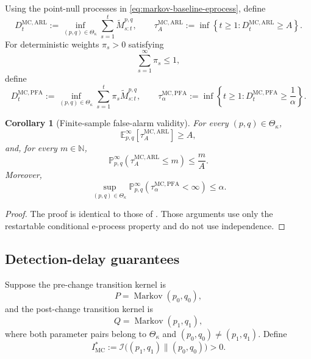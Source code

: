 \documentclass[12pt]{article}
\DeclareMathOperator{\Markov}{Markov}
\theoremstyle{spaced}
\newtheorem{corollary}[corollary]{Corollary}
\theoremstyle{remark}
\begin{document}
Using the point-null processes in
\eqref{eq:markov-baseline-eprocess}, define
\begin{equation}
\label{eq:markov-arl-detector}
    D_t^{\mathrm{MC},\mathrm{ARL}}
    :=
    \inf_{(p,q)\in\Theta_\kappa}
    \sum_{s=1}^t
    \widetilde M_{s:t}^{p,q},
    \qquad
    \tau_A^{\mathrm{MC},\mathrm{ARL}}
    :=
    \inf\left\{
        t\ge1:
        D_t^{\mathrm{MC},\mathrm{ARL}}\ge A
    \right\}.
\end{equation}
For deterministic weights \(\pi_s>0\) satisfying
\[
    \sum_{s=1}^\infty\pi_s\le1,
\]
define
\begin{equation}
\label{eq:markov-pfa-detector}
    D_t^{\mathrm{MC},\mathrm{PFA}}
    :=
    \inf_{(p,q)\in\Theta_\kappa}
    \sum_{s=1}^t
    \pi_s\widetilde M_{s:t}^{p,q},
    \qquad
    \tau_\alpha^{\mathrm{MC},\mathrm{PFA}}
    :=
    \inf\left\{
        t\ge1:
        D_t^{\mathrm{MC},\mathrm{PFA}}
        \ge\frac1\alpha
    \right\}.
\end{equation}

\begin{corollary}[Finite-sample false-alarm validity]
\label{cor:markov-false-alarm}
For every \((p,q)\in\Theta_\kappa\),
\[
    \mathbb E_{p,q}^\infty
    \left[
        \tau_A^{\mathrm{MC},\mathrm{ARL}}
    \right]
    \ge A,
\]
and, for every \(m\in\mathbb N\),
\[
    \mathbb P_{p,q}^\infty
    \left(
        \tau_A^{\mathrm{MC},\mathrm{ARL}}\le m
    \right)
    \le\frac mA.
\]
Moreover,
\[
    \sup_{(p,q)\in\Theta_\kappa}
    \mathbb P_{p,q}^\infty
    \left(
        \tau_\alpha^{\mathrm{MC},\mathrm{PFA}}<\infty
    \right)
    \le\alpha.
\]
\end{corollary}

\begin{proof}
The proof is identical to those of
.  Those arguments use only the
restartable conditional e-process property and do not use independence.
\end{proof}

\subsection{Detection-delay guarantees}

Suppose the pre-change transition kernel is
\[
    P=\Markov(p_0,q_0),
\]
and the post-change transition kernel is
\[
    Q=\Markov(p_1,q_1),
\]
where both parameter pairs belong to \(\Theta_\kappa\) and
\((p_0,q_0)\ne(p_1,q_1)\).  Define
\begin{equation}
\label{eq:markov-Istar}
    I_{\mathrm{MC}}^*
    :=
    \mathcal I\bigl((p_1,q_1)\|(p_0,q_0)\bigr)
    >0.
\end{equation}
\end{document}
